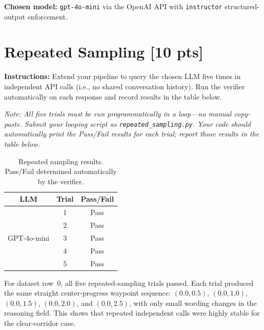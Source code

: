 \documentclass[12pt]{article}
\begin{document}
\medskip
\noindent\textbf{Chosen model:} \texttt{gpt-4o-mini} via the OpenAI API with
\texttt{instructor} structured-output enforcement.



\newpage
\section{Repeated Sampling [10 pts]}

\noindent\textbf{Instructions:} Extend your pipeline to query the chosen LLM five times in
independent API calls (i.e., no shared conversation history). Run the verifier automatically on
each response and record results in the table below.

\medskip
\noindent\textit{Note: All five trials must be run programmatically in a loop---no manual
copy-paste. Submit your looping script as \texttt{repeated\_sampling.py}. Your code should
automatically print the Pass/Fail results for each trial; report those results in the table
below.}



\begin{table}[H]
  \centering
  \begin{tabular}{ccc}
    \toprule
    \textbf{LLM} & \textbf{Trial} & \textbf{Pass/Fail} \\
    \midrule
                     & 1 & Pass \\
                     & 2 & Pass \\
    GPT-4o-mini     & 3 & Pass \\
                     & 4 & Pass \\
                     & 5 & Pass \\
    \bottomrule
  \end{tabular}
  \caption{Repeated sampling results. Pass/Fail determined automatically by the verifier.}
  \label{tab:repeated_sampling}
\end{table}

\medskip
\noindent
For dataset row~0, all five repeated-sampling trials passed. Each trial produced the same
straight center-progress waypoint sequence: $(0.0, 0.5)$, $(0.0, 1.0)$, $(0.0, 1.5)$,
$(0.0, 2.0)$, and $(0.0, 2.5)$, with only small wording changes in the reasoning field. This
shows that repeated independent calls were highly stable for the clear-corridor case.
\end{document}
